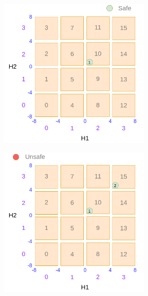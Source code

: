 \begin{figure}
	\centering
	\begin{subfigure}{0.45\textwidth}
		\includegraphics[width=0.8\textwidth]{figures/draw/a.png}
		\caption{}
		\label{fig:dsbo-example-a}
	\end{subfigure}
	\begin{subfigure}{0.45\textwidth}
		\includegraphics[width=0.8\textwidth]{figures/draw/b.png}
		\caption{}
		\label{fig:dsbo-example-b}
	\end{subfigure}
	\begin{subfigure}{0.45\textwidth}

\end{subfigure}
\end{figure}
